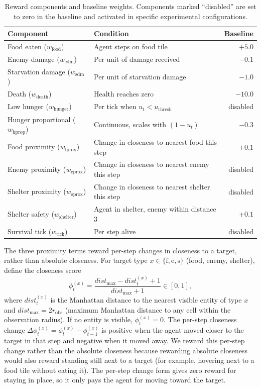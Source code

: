 \documentclass[12pt,a4paper,titlepage]{article}
\begin{document}
\begin{table}[h]
\centering
\caption{Reward components and baseline weights. Components marked ``disabled'' are set to zero in the baseline and activated in specific experimental configurations.}
\label{tab:default_rewards}
\small
\begin{tabular}{llr}
\toprule
Component & Condition & Baseline \\
\midrule
Food eaten ($w_\text{food}$)          & Agent steps on food tile              & $+5.0$ \\
Enemy damage ($w_\text{edm}$)         & Per unit of damage received           & $-0.1$ \\
Starvation damage ($w_\text{sdm}$)    & Per unit of starvation damage         & $-1.0$ \\
Death ($w_\text{death}$)              & Health reaches zero                   & $-10.0$ \\
Low hunger ($w_\text{hunger}$)        & Per tick when $u_t < u_\text{thresh}$ & disabled \\
Hunger proportional ($w_\text{hprop}$) & Continuous, scales with $(1 - u_t)$  & $-0.3$ \\
Food proximity ($w_\text{fprox}$)     & Change in closeness to nearest food this step    & $+0.1$ \\
Enemy proximity ($w_\text{eprox}$)    & Change in closeness to nearest enemy this step   & disabled \\
Shelter proximity ($w_\text{sprox}$)  & Change in closeness to nearest shelter this step & disabled \\
Shelter safety ($w_\text{shelter}$)   & Agent in shelter, enemy within distance 3 & $+0.1$ \\
Survival tick ($w_\text{tick}$)       & Per step alive                        & disabled \\
\bottomrule
\end{tabular}
\end{table}


The three proximity terms reward per-step changes in closeness to a target, rather than absolute closeness. For target type $x \in \{\text{f}, \text{e}, \text{s}\}$ (food, enemy, shelter), define the closeness score
\begin{equation}
\phi_t^{(x)} = \frac{dist_\text{max} - dist_t^{(x)} + 1}{dist_\text{max} + 1} \in [0, 1],
\end{equation}
where $dist_t^{(x)}$ is the Manhattan distance to the nearest visible entity of type $x$ and $dist_\text{max} = 2r_\text{obs}$ (maximum Manhattan distance to any cell within the observation radius). If no entity is visible, $\phi_t^{(x)} = 0$. The per-step closeness change $\Delta\phi_t^{(x)} = \phi_t^{(x)} - \phi_{t-1}^{(x)}$ is positive when the agent moved closer to the target in that step and negative when it moved away. We reward this per-step change rather than the absolute closeness because rewarding absolute closeness would also reward standing still next to a target (for example, hovering next to a food tile without eating it). The per-step change form gives zero reward for staying in place, so it only pays the agent for moving toward the target.
\end{document}
